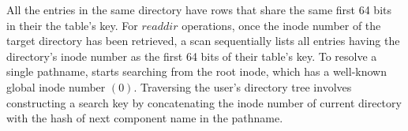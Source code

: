 All the entries in the same directory have rows that 
share the same first 64 bits in their the table's key.
For $readdir$ operations, once the inode number
of the target directory has been retrieved, 
a scan sequentially lists all entries having 
the directory's inode number as the first 64 bits of their table's key. 
To resolve a single pathname, \tfs starts searching from the root inode, 
which has a well-known global inode number $(0)$.
Traversing the user's directory tree
involves constructing a search key by concatenating the inode 
number of current directory with the hash of
next component name in the pathname.
